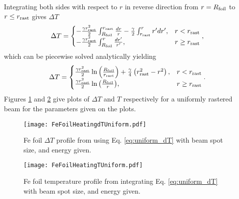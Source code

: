 \documentclass[12pt]{article}
\begin{document}
Integrating both sides with respect to $r$ in reverse direction from $r=R_{\rm foil}$ to $r\leq r_{\rm rast}$ gives $\Delta T$ 
\[
\Delta T=
\begin{cases}
-\frac{\gamma r_{\rm rast}^2}{2}\int_{R_{\rm foil}}^{r_{\rm rast}}\frac{dr}{r}-\frac{\gamma}{2}\int_{r_{\rm rast}}^r r^\prime dr^\prime,& r<r_{\rm rast}\\
-\frac{\gamma r_{\rm rast}^2}{2}\int_{R_{\rm foil}}^{r}\frac{dr^\prime}{r^\prime},& r\geq r_{\rm rast}

\end{cases},
\]
which can be piecewise solved analytically yielding
\begin{equation}
\label{eq:uniform_dT}
\Delta T = 
\begin{cases}
\frac{\gamma r_{\rm rast}^2}{2}\ln{\left(\frac{R_{\rm foil}}{r_{\rm rast}}\right)}+\frac{\gamma}{4}\left(r_{\rm rast}^2-r^2\right),& r <r_{\rm rast}\\
\frac{\gamma r_{\rm rast}^2}{2}\ln{\left(\frac{R_{\rm foil}}{r}\right)},& r \geq r_{\rm rast}\\

\end{cases}.
\end{equation}
Figures \ref{fig:foilheating_uni} and \ref{fig:foilheatingT_uni} give plots of $\Delta T$ and $T$ respectively for a uniformly rastered beam for the parameters given on the plots.

\begin{figure}[h]
\centering
\texttt{[image: FeFoilHeatingdTUniform.pdf]}
\caption{\label{fig:foilheating_uni}Fe foil $\Delta T$ profile from using Eq. \ref{eq:uniform_dT} with beam spot size, and energy given.}
\end{figure}
\begin{figure}[h]
\centering
\texttt{[image: FeFoilHeatingTUniform.pdf]}
\caption{\label{fig:foilheatingT_uni}Fe foil temperature profile from integrating Eq. \ref{eq:uniform_dT} with beam spot size, and energy given.}
\end{figure}

\clearpage
\end{document}
